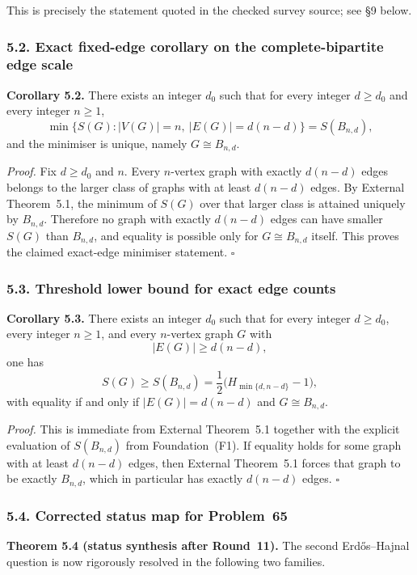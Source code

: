\medskip
\noindent This is precisely the statement quoted in the checked survey source; see \S9 below.

\subsubsection*{5.2. Exact fixed-edge corollary on the complete-bipartite edge scale}

\textbf{Corollary 5.2.}
There exists an integer $d_0$ such that for every integer $d\ge d_0$ and every integer $n\ge 1$,
\[
\min\{S(G): |V(G)|=n,\ |E(G)|=d(n-d)\}=S(B_{n,d}),
\]
and the minimiser is unique, namely $G\cong B_{n,d}$.

\medskip
\textit{Proof.}
Fix $d\ge d_0$ and $n$.
Every $n$-vertex graph with exactly $d(n-d)$ edges belongs to the larger class of graphs with at least $d(n-d)$ edges. By External Theorem~5.1, the minimum of $S(G)$ over that larger class is attained uniquely by $B_{n,d}$.
Therefore no graph with exactly $d(n-d)$ edges can have smaller $S(G)$ than $B_{n,d}$, and equality is possible only for $G\cong B_{n,d}$ itself.
This proves the claimed exact-edge minimiser statement.
\hfill$\square$

\subsubsection*{5.3. Threshold lower bound for exact edge counts}

\textbf{Corollary 5.3.}
There exists an integer $d_0$ such that for every integer $d\ge d_0$, every integer $n\ge 1$, and every $n$-vertex graph $G$ with
\[
|E(G)|\ge d(n-d),
\]
one has
\[
S(G)\ge S(B_{n,d})=\frac12\bigl(H_{\min\{d,n-d\}}-1\bigr),
\]
with equality if and only if $|E(G)|=d(n-d)$ and $G\cong B_{n,d}$.

\medskip
\textit{Proof.}
This is immediate from External Theorem~5.1 together with the explicit evaluation of $S(B_{n,d})$ from Foundation~(F1).
If equality holds for some graph with at least $d(n-d)$ edges, then External Theorem~5.1 forces that graph to be exactly $B_{n,d}$, which in particular has exactly $d(n-d)$ edges.
\hfill$\square$

\subsubsection*{5.4. Corrected status map for Problem~65}

\textbf{Theorem 5.4 (status synthesis after Round~11).}
The second Erd\H{o}s--Hajnal question is now rigorously resolved in the following two families.

